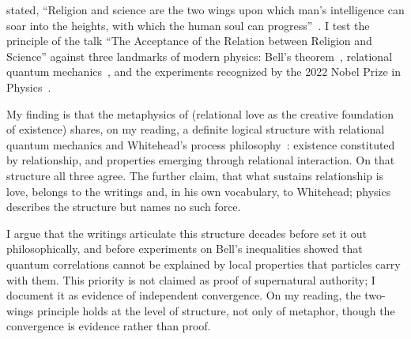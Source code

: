 
\AbdulBaha stated, ``Religion and science are the two wings upon which man's intelligence can soar into the heights, with which the human soul can progress''~\citep[p.~143]{ParisTalks}. I test the principle of the talk ``The Acceptance of the Relation between Religion and Science'' against three landmarks of modern physics: Bell's theorem~\citep{Bell1964}, relational quantum mechanics~\citep{Rovelli1996}, and the experiments recognized by the 2022 Nobel Prize in Physics~\citep{Zeilinger2023Nobel}.

My finding is that the \bahai metaphysics of \mahabbat (relational love as the creative foundation of existence) shares, on my reading, a definite logical structure with relational quantum mechanics and Whitehead's process philosophy~\citep{Whitehead1929}: existence constituted by relationship, and properties emerging through relational interaction. On that structure all three agree. The further claim, that what sustains relationship is love, belongs to the writings and, in his own vocabulary, to Whitehead; physics describes the structure but names no such force.

I argue that the \bahai writings articulate this structure decades before \citeauthor{Whitehead1929} set it out philosophically, and before experiments on Bell's inequalities showed that quantum correlations cannot be explained by local properties that particles carry with them. This priority is not claimed as proof of supernatural authority; I document it as evidence of independent convergence. On my reading, the two-wings principle holds at the level of structure, not only of metaphor, though the convergence is evidence rather than proof.
